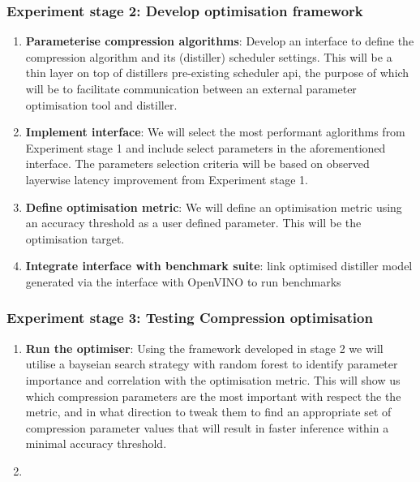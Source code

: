 \documentclass[../D1.tex]{subfiles}
\begin{document}
\subsubsection{Experiment stage 2: Develop optimisation framework}\label{sec:Experiment2}
\begin{enumerate}
    \item \textbf{Parameterise compression algorithms}: Develop an interface to define the compression algorithm and its (distiller) scheduler settings. This will be a thin layer on top of distillers pre-existing scheduler api, the purpose of which will be to facilitate communication between an external parameter optimisation tool and distiller.
    \item \textbf{Implement interface}: We will select the most performant aglorithms from Experiment stage 1 and include select parameters in the aforementioned interface. The parameters selection criteria will be based on observed layerwise latency improvement from Experiment stage 1.
    \item \textbf{Define optimisation metric}: We will define an optimisation metric using an accuracy threshold as a user defined parameter. This will be the optimisation target.
    \item \textbf{Integrate interface with benchmark suite}: link optimised distiller model generated via the interface with OpenVINO to run benchmarks
\end{enumerate}

\subsubsection{Experiment stage 3: Testing Compression optimisation}\label{sec:Experiment3}
\begin{enumerate}
    \item \textbf{Run the optimiser}: Using the framework developed in stage 2 we will utilise a bayseian search strategy with random forest to identify parameter importance and correlation with the optimisation metric. This will show us which compression parameters are the most important with respect the the metric, and in what direction to tweak them to find an appropriate set of compression parameter values that will result in faster inference within a minimal accuracy threshold.
    \item 
\end{enumerate}
\end{document}

